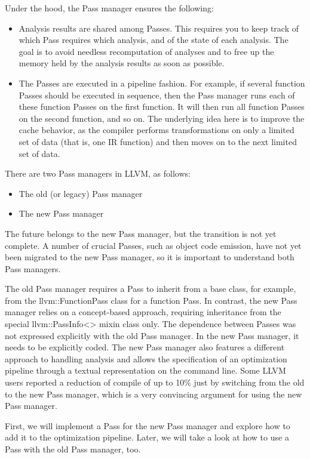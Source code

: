 Under the hood, the Pass manager ensures the following:\par

\begin{itemize}
	\item Analysis results are shared among Passes. This requires you to keep track of which Pass requires which analysis, and of the state of each analysis. The goal is to avoid needless recomputation of analyses and to free up the memory held by the analysis results as soon as possible.
	\item The Passes are executed in a pipeline fashion. For example, if several function Passes should be executed in sequence, then the Pass manager runs each of these function Passes on the first function. It will then run all function Passes on the second function, and so on. The underlying idea here is to improve the cache behavior, as the compiler performs transformations on only a limited set of data (that is, one IR function) and then moves on to the next limited set of data.
\end{itemize}

There are two Pass managers in LLVM, as follows: \par

\begin{itemize}
	\item The old (or legacy) Pass manager 
	\item The new Pass manager
\end{itemize}

The future belongs to the new Pass manager, but the transition is not yet complete. A number of crucial Passes, such as object code emission, have not yet been migrated to the new Pass manager, so it is important to understand both Pass managers.\par

The old Pass manager requires a Pass to inherit from a base class, for example, from the llvm::FunctionPass class for a function Pass. In contrast, the new Pass manager relies on a concept-based approach, requiring inheritance from the special llvm::PassInfo<> mixin class only. The dependence between Passes was not expressed explicitly with the old Pass manager. In the new Pass manager, it needs to be explicitly coded. The new Pass manager also features a different approach to handling analysis and allows the specification of an optimization pipeline through a textual representation on the command line. Some LLVM users reported a reduction of compile of up to 10\% just by switching from the old to the new Pass manager, which is a very convincing argument for using the new Pass manager.\par

First, we will implement a Pass for the new Pass manager and explore how to add it to the optimization pipeline. Later, we will take a look at how to use a Pass with the old Pass manager, too.\par

